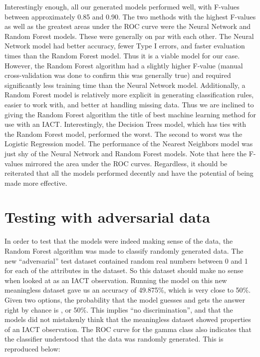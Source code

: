 \documentclass[a4paper, 12pt]{report}
\theoremstyle{definition}
\begin{document}
Interestingly enough, all our generated models performed well, with F-values between approximately 0.85 and 0.90. The two methods with the highest F-values as well as the greatest areas under the ROC curve were the Neural Network and Random Forest models. These were generally on par with each other. The Neural Network model had better accuracy, fewer Type I errors, and faster evaluation times than the Random Forest model. Thus it is a viable model for our case. However, the Random Forest algorithm had a slightly higher F-value (manual cross-validation was done to confirm this was generally true) and required significantly less training time than the Neural Network model. Additionally, a Random Forest model is relatively more explicit in generating classification rules, easier to work with, and better at handling missing data. Thus we are inclined to giving the Random Forest algorithm the title of best machine learning method for use with an IACT. Interestingly, the Decision Trees model, which has ties with the Random Forest model, performed the worst. The second to worst was the Logistic Regression model. The performance of the Nearest Neighbors model was just shy of the Neural Network and Random Forest models. Note that here the F-values mirrored the area under the ROC curves. Regardless, it should be reiterated that all the models performed decently and have the potential of being made more effective.

\section{Testing with adversarial data}

In order to test that the models were indeed making sense of the data, the Random Forest algorithm was made to classify randomly generated data. The new \enquote{adversarial} test dataset contained random real numbers between 0 and 1 for each of the attributes in the dataset. So this dataset should make no sense when looked at as an IACT observation. Running the model on this new meaningless dataset gave us an accuracy of 49.875\%, which is very close to 50\%. Given two options, the probability that the model guesses and gets the answer right by chance is \textonehalf, or 50\%. This implies \enquote{no discrimination}, and that the models did not mistakenly think that the meaningless dataset showed properties of an IACT observation. The ROC curve for the gamma class also indicates that the classifier understood that the data was randomly generated. This is reproduced below:
\end{document}
